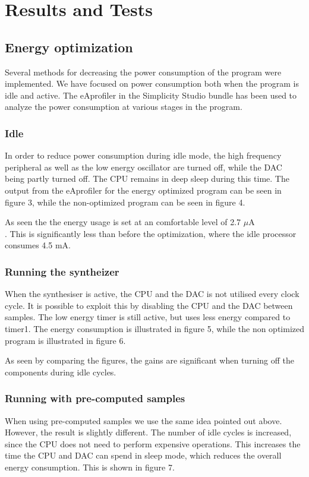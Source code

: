 \section{Results and Tests}

\subsection{Energy optimization}
Several methods for decreasing the power consumption of the program were implemented. We have focused on power consumption both when the program is idle and active. The eAprofiler in the Simplicity Studio bundle has been used to analyze the power consumption at various stages in the program.

\subsubsection{Idle}
In order to reduce power consumption during idle mode, the high frequency peripheral as well as the low energy oscillator are turned off, while the DAC being partly turned off. The CPU remains in deep sleep during this time. The output from the eAprofiler for the energy optimized program can be seen in figure 3, while the non-optimized program can be seen in figure 4. 





As seen the the energy usage is set at an comfortable level of 2.7 $\mu$A \\. This is significantly less than before the optimization, where the idle processor consumes 4.5 mA. 

\subsubsection{Running the syntheizer}
When the synthesiser is active, the CPU and the DAC is not utilised every clock cycle. It is possible to exploit this by disabling the CPU and the DAC between samples. The low energy timer is still active, but uses less energy compared to timer1. The energy consumption is illustrated in figure 5, while the non optimized program is illustrated in figure 6.    




As seen by comparing the figures, the gains are significant when turning off the components during idle cycles. 


\subsubsection{Running with pre-computed samples}
When using pre-computed samples we use the same idea pointed out above. However, the result is slightly different. The number of idle cycles is increased, since the CPU does not need to perform expensive operations. This increases the time the CPU and DAC can spend in sleep mode, which reduces the overall energy consumption. This is shown in figure 7.

